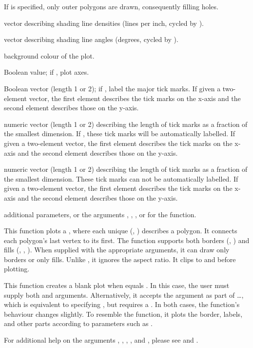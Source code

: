 \documentclass[letterpaper]{book}
\begin{document}
\begin{Arguments}
\begin{ldescription}
If  is specified, only outer polygons are drawn, consequently filling holes.
\item[\code{density}] vector describing shading line densities (lines per
inch, cycled by ).
\item[\code{angle}] vector describing shading line angles (degrees, cycled by
).
\item[\code{bg}] background colour of the plot.
\item[\code{axes}] Boolean value; if , plot axes.
\item[\code{tckLab}] Boolean vector (length 1 or 2); if ,
label the major tick marks.  If given a two-element
vector, the first element describes the tick marks on the
x-axis and the second element describes those on the y-axis.
\item[\code{tck}] numeric vector (length 1 or 2) describing the length
of tick marks as a fraction of the smallest dimension. If
, these tick marks will be automatically
labelled.  If given a two-element vector, the first element
describes the tick marks on the x-axis and the second element
describes those on the y-axis.
\item[\code{tckMinor}] numeric vector (length 1 or 2) describing the length
of tick marks as a fraction of the smallest dimension.  These tick
marks can not be automatically labelled.  If given a two-element
vector, the first element describes the tick marks on the x-axis and
the second element describes those on the y-axis.
\item[\code{...}] additional  parameters, or the arguments
, , , or  for the
 function.
\end{ldescription}
\end{Arguments}
%
\begin{Details}\relax
This function plots a , where each unique (,
) describes a polygon.  It connects each polygon's last
vertex to its first.  The function supports both borders
(, ) and fills (, ,
).  When supplied with the appropriate arguments, it can
draw only borders or only fills.  Unlike , it
ignores the aspect ratio.  It clips  to  and
 before plotting.

This function creates a blank plot when  equals
.  In this case, the user must supply both  and
 arguments.  Alternatively, it accepts the argument
 as part of \dots, which is equivalent to specifying
, but requires a .  In both cases,
the function's behaviour changes slightly.  To resemble the
 function, it plots the border, labels, and other
parts according to  parameters such as .

For additional help on the arguments , ,
, , and , please see
 and .
\end{Details}
\end{document}
